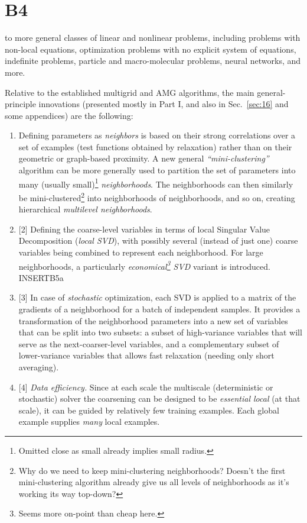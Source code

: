 \documentclass{article} %
\newcommand{\ins}{INSERT}
\begin{document}
\section{B4}
to more general classes of linear and nonlinear problems, including problems with non-local equations, optimization problems with no explicit system of equations, indefinite problems, particle and macro-molecular problems, neural networks, and more.

Relative to the established multigrid and AMG algorithms, the main general-principle innovations (presented mostly in Part I, and also in Sec.~\ref{sec:16} and some appendices) are the following:
\begin{enumerate}
    \item[(1)] Defining parameters as {\it neighbors} is based on their strong correlations over a set of examples (test functions obtained by relaxation) rather than on their geometric or graph-based proximity. A new general {\it ``mini-clustering''} algorithm can be more generally used to partition the set of parameters into many (usually small)\footnote{Omitted close as small already implies small radius.} {\it neighborhoods}. The neighborhoods can then similarly be mini-clustered\footnote{Why do we need to keep mini-clustering neighborhoods? Doesn't the first mini-clustering algorithm already give us all levels of neighborhoods as it's working its way top-down?} into neighborhoods of neighborhoods, and so on, creating hierarchical {\it multilevel neighborhoods}.
    \item{[2]} Defining the coarse-level variables in terms of local Singular Value Decomposition ({\it local SVD}), with possibly several (instead of just one) coarse variables being combined to represent each neighborhood. For large neighborhoods, a particularly {\it economical\footnote{Seems more on-point than cheap here.} SVD} variant is introduced. \ins{B5a}
    \item{[3]} In case of {\it stochastic} optimization, each SVD is applied to a matrix of the gradients of a neighborhood for a batch of independent samples. It provides a transformation of the neighborhood parameters into a new set of variables that can be split into two subsets: a subset of high-variance variables that will serve as the next-coarser-level variables, and a complementary subset of lower-variance variables that allows fast relaxation (needing only short averaging).
    \item{[4]} {\it Data efficiency.} Since at each scale the multiscale (deterministic or stochastic) solver the coarsening can be designed to be {\it essential local} (at that scale), it can be guided by relatively few training examples. Each global example supplies {\it many} local examples.

\end{enumerate}
\end{document}
